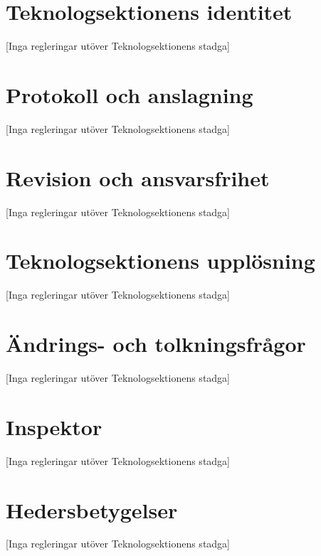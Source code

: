 \documentclass[a4paper]{dteklag}
\begin{document}
\section{Teknologsektionens identitet}
\begin{center}
  [Inga regleringar utöver Teknologsektionens stadga]
\end{center}
\section{Protokoll och anslagning}
\begin{center}
  [Inga regleringar utöver Teknologsektionens stadga]
\end{center}
\section{Revision och ansvarsfrihet}
\begin{center}
  [Inga regleringar utöver Teknologsektionens stadga]
\end{center}
\section{Teknologsektionens upplösning}
\begin{center}
  [Inga regleringar utöver Teknologsektionens stadga]
\end{center}
\section{Ändrings- och tolkningsfrågor}
\begin{center}
  [Inga regleringar utöver Teknologsektionens stadga]
\end{center}
\section{Inspektor}
\begin{center}
  [Inga regleringar utöver Teknologsektionens stadga]
\end{center}
\section{Hedersbetygelser}
\begin{center}
  [Inga regleringar utöver Teknologsektionens stadga]
\end{center}
\end{document}
